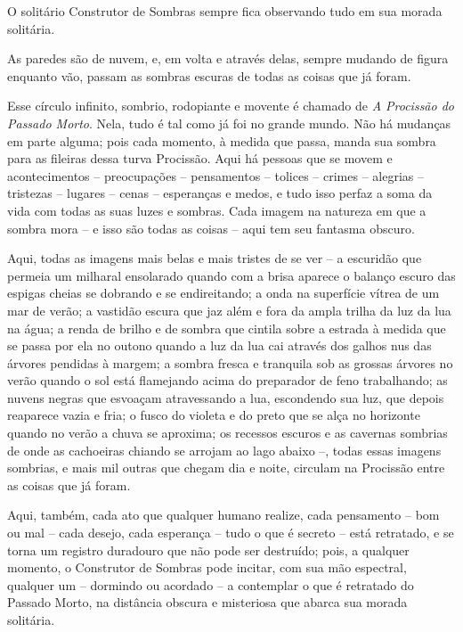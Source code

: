  

O solitário Construtor de Sombras sempre fica observando tudo em sua morada
solitária.

As paredes são de nuvem, e, em volta e através delas, sempre mudando de figura enquanto vão, passam as sombras escuras de todas as coisas que já foram.

Esse círculo infinito, sombrio, rodopiante e movente é chamado de
\emph{A Procissão do Passado Morto}. Nela, tudo é tal como já foi no
grande mundo. Não há mudanças em parte alguma; pois cada momento, à
medida que passa, manda sua sombra para as fileiras dessa turva
Procissão. Aqui há pessoas que se movem e acontecimentos -- preocupações --
pensamentos -- tolices -- crimes -- alegrias -- tristezas -- lugares --
cenas -- esperanças e medos, e tudo isso perfaz a soma da vida com todas as
suas luzes e sombras. Cada imagem na natureza em que a sombra mora -- e
isso são todas as coisas -- aqui tem seu fantasma obscuro.



Aqui, todas as imagens mais belas e mais tristes de se ver -- a
escuridão que permeia um milharal ensolarado quando com a brisa aparece o
balanço escuro das espigas cheias se dobrando e se endireitando; a onda na
superfície vítrea de um mar de verão; a vastidão escura que jaz além e
fora da ampla trilha da luz da lua na água; a renda de brilho e de
sombra que cintila sobre a estrada à medida que se passa por ela no
outono quando a luz da lua cai através dos galhos nus das árvores
pendidas à margem; a sombra fresca e tranquila sob as grossas árvores no
verão quando o sol está flamejando acima do preparador de feno
trabalhando; as nuvens negras que esvoaçam atravessando a lua, escondendo
sua luz, que depois reaparece vazia e fria; o fusco do violeta e do
preto que se alça no horizonte quando no verão a chuva se aproxima; os
recessos escuros e as cavernas sombrias de onde as cachoeiras chiando
se arrojam ao lago abaixo --, todas essas imagens sombrias, e mais mil
outras que chegam dia e noite, circulam na Procissão entre as coisas que já
foram.

Aqui, também, cada ato que qualquer humano realize, cada pensamento --
bom ou mal -- cada desejo, cada esperança -- tudo o que é secreto --
está retratado, e se torna um registro duradouro que não pode ser
destruído; pois, a qualquer momento, o Construtor de Sombras pode
incitar, com sua mão espectral, qualquer um -- dormindo ou acordado -- a
contemplar o que é retratado do Passado Morto, na distância obscura e
misteriosa que abarca sua morada solitária.


